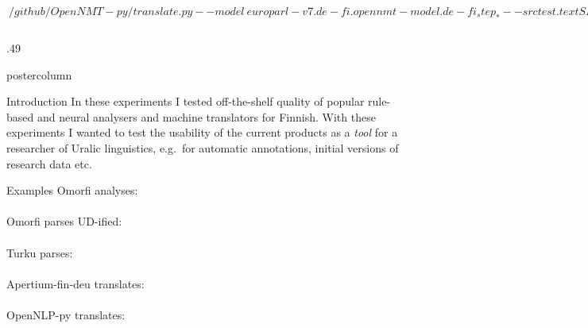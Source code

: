\documentclass[final,hyperref={pdfpagelabels}]{beamer}
\newlength{\columnheight}
\begin{document}
\begin{myverbbox}[\scriptsize]{\OpenNLPs}
$ ~/github/OpenNMT-py/translate.py --model \
    europarl-v7.de-fi.opennmt-model.de-fi_step_* --src test.text
SENT 1: ('Die', 'Entwicklung', 'des', 'heutigen', 'Gebietes', 'der', 'Stadt', 'begann', 'ab', '1748.')
PRED 1: nykyisen alueen kehittäminen alkoi 1748. .
$
\end{myverbbox}

\begin{frame}
      \maketitle
      \begin{columns}
      \begin{column}{.49\textwidth}
      \begin{beamercolorbox}[center,wd=\textwidth]{postercolumn}
          \begin{minipage}[T]{.95\textwidth}  %
          \parbox[t][\columnheight]{\textwidth}{%
        \begin{block}{Introduction}
            In these experiments I tested off-the-shelf quality of popular
            rule-based and neural analysers and machine translators for Finnish.
            With these experiments I wanted to test the usability of the current
            products as a \textit{tool} for a researcher of Uralic linguistics,
            e.g.\ for automatic annotations, initial versions of research data
            etc.
        \end{block}

        \begin{block}{Examples}
            Omorfi analyses:\\
            \fbox{\OmorfiAnals}\\
            Omorfi parses UD-ified:\\
            \fbox{\OmorfiUDs}\\
            Turku parses:\\
            \fbox{\TurkuParses}\\
            Apertium-fin-deu translates:\\
            \fbox{\Apertiums}\\
            OpenNLP-py translates:\\
            \fbox{\OpenNLPs}
        \end{block}

}
\end{minipage}
\end{beamercolorbox}
\end{column}
\end{columns}
\end{frame}
\end{document}
